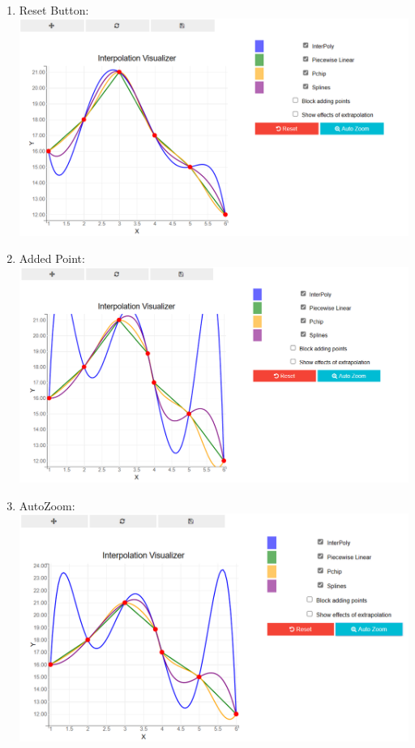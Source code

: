 \begin{enumerate}
\item Reset Button: \\
\includegraphics[scale=0.5]{Include/Images/Thesis/Documentation/Visualizers/Interpolation/Example 1/Example 1 - 02 - Reset Button.png}

\item Added Point: \\
\includegraphics[scale=0.5]{Include/Images/Thesis/Documentation/Visualizers/Interpolation/Example 1/Example 1 - 03 - Added Point.png}

\item AutoZoom: \\
\includegraphics[scale=0.5]{Include/Images/Thesis/Documentation/Visualizers/Interpolation/Example 1/Example 1 - 04 -AutoZoom.png}
\end{enumerate}